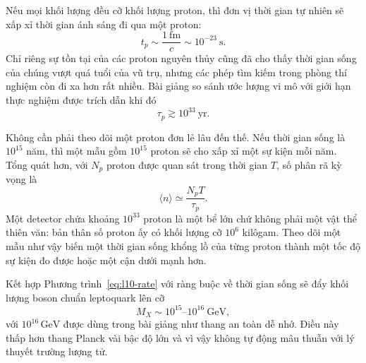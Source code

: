 
\begin{classroomqa}
\end{classroomqa}

Nếu mọi khối lượng đều cỡ khối lượng proton, thì đơn vị thời gian tự nhiên sẽ xấp xỉ thời gian ánh sáng đi qua một proton:
\begin{equation}
t_p\sim\frac{1\ \mathrm{fm}}{c}\sim10^{-23}\ \mathrm{s}.
\label{eq:l10-proton-time}
\end{equation}
Chỉ riêng sự tồn tại của các proton nguyên thủy cũng đã cho thấy thời gian sống của chúng vượt quá tuổi của vũ trụ, nhưng các phép tìm kiếm trong phòng thí nghiệm còn đi xa hơn rất nhiều. Bài giảng so sánh ước lượng vi mô với giới hạn thực nghiệm được trích dẫn khi đó
\begin{equation}
\tau_p\gtrsim10^{33}\ \mathrm{yr}.
\label{eq:l10-lifetime-bound}
\end{equation}

Không cần phải theo dõi một proton đơn lẻ lâu đến thế. Nếu thời gian sống là \(10^{15}\) năm, thì một mẫu gồm \(10^{15}\) proton sẽ cho xấp xỉ một sự kiện mỗi năm. Tổng quát hơn, với \(N_p\) proton được quan sát trong thời gian \(T\), số phân rã kỳ vọng là
\begin{equation}
\langle n\rangle\simeq\frac{N_pT}{\tau_p}.
\label{eq:l10-event-count}
\end{equation}
Một detector chứa khoảng \(10^{33}\) proton là một bể lớn chứ không phải một vật thể thiên văn: bản thân số proton ấy có khối lượng cỡ \(10^6\) kilôgam. Theo dõi một mẫu như vậy biến một thời gian sống khổng lồ của từng proton thành một tốc độ sự kiện đo được hoặc một cận dưới mạnh hơn.

Kết hợp Phương trình~\eqref{eq:l10-rate} với ràng buộc về thời gian sống sẽ đẩy khối lượng boson chuẩn leptoquark lên cỡ
\begin{equation}
M_X\sim10^{15}\text{--}10^{16}\ \mathrm{GeV},
\label{eq:l10-mx}
\end{equation}
với \(10^{16}\,\mathrm{GeV}\) được dùng trong bài giảng như thang an toàn dễ nhớ. Điều này thấp hơn thang Planck vài bậc độ lớn và vì vậy không tự động mâu thuẫn với lý thuyết trường lượng tử.

